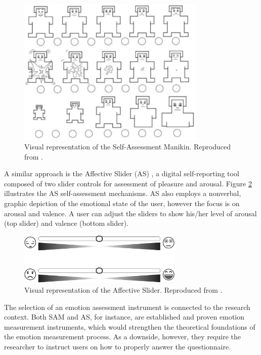\begin{figure}[h]
    \centering
    \includegraphics[width=0.8\textwidth]{Content/figures/SAM.png}
    \caption{Visual representation of the Self-Assessment Manikin. Reproduced from \textcite{morris1995observations}.}
    \label{fig:sam}
\end{figure}

A similar approach is the Affective Slider (AS) \parencite{betella2016affective}, a digital self-reporting tool composed of two slider controls for assessment of pleasure and arousal. Figure \ref{fig:as} illustrates the AS self-assessment mechanisms. AS also employs a nonverbal, graphic depiction of the emotional state of the user, however the focus is on arousal and valence. A user can adjust the sliders to show his/her level of arousal (top slider) and valence (bottom slider).

\begin{figure}[h]
    \centering
    \includegraphics[width=0.7\textwidth]{Content/figures/AS.png}
    \caption{Visual representation of the Affective Slider. Reproduced from \textcite{betella2016affective}.}
    \label{fig:as}
\end{figure}

The selection of an emotion assessment instrument is connected to the research context. Both SAM and AS, for instance, are established and proven emotion measurement instruments, which would strengthen the theoretical foundations of the emotion measurement process. As a downside, however, they require the researcher to instruct users on how to properly answer the questionnaire.
